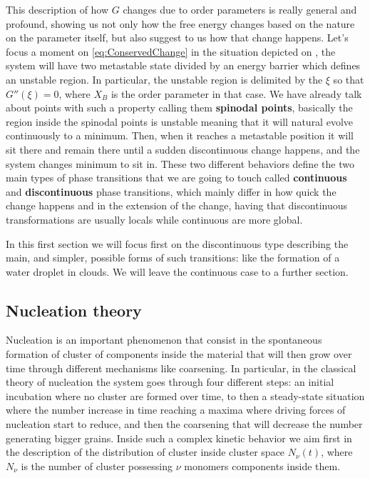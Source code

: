 This description of how $G$ changes due to order parameters is really general and profound, showing us not only how the free energy changes based on the nature on the parameter itself, but also suggest to us how that change happens. Let's focus a moment on \eqref{eq:ConservedChange} in the situation depicted on , the system will have two metastable state divided by an energy barrier which defines an unstable region. In particular, the unstable region is delimited by the $\xi$ so that $G''(\xi) = 0$, where $X_B$ is the order parameter in that case. We have already talk about points with such a property calling them \textbf{spinodal points}, basically the region inside the spinodal points is unstable meaning that it will natural evolve continuously to a minimum. Then, when it reaches a metastable position it will sit there and remain there until a sudden discontinuous change happens, and the system changes minimum to sit in. These two different behaviors define the two main types of phase transitions that we are going to touch called \textbf{continuous} and \textbf{discontinuous} phase transitions, which mainly differ in how quick the change happens and in the extension of the change, having that discontinuous transformations are usually locals while continuous are more global. 

In this first section we will focus first on the discontinuous type describing the main, and simpler, possible forms of such transitions: like the formation of a water droplet in clouds. We will leave the continuous case to a further section.

\subsection{Nucleation theory}

Nucleation is an important phenomenon that consist in the spontaneous formation of cluster of components inside the material that will then grow over time through different mechanisms like coarsening. In particular, in the classical theory of nucleation the system goes through four different steps: an initial incubation where no cluster are formed over time, to then a steady-state situation where the number increase in time reaching a maxima where driving forces of nucleation start to reduce, and then the coarsening that will decrease the number generating bigger grains. Inside such a complex kinetic behavior we aim first in the description of the distribution of cluster inside cluster space $N_\nu(t)$, where $N_\nu$ is the number of cluster possessing $\nu$ monomers components inside them.

